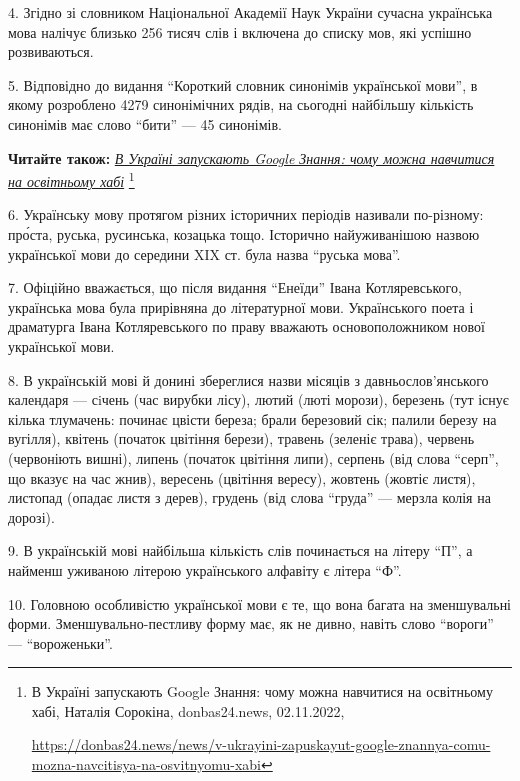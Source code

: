 4. Згідно зі словником Національної Академії Наук України сучасна українська
мова налічує близько 256 тисяч слів і включена до списку мов, які успішно
розвиваються.

5. Відповідно до видання \enquote{Короткий словник синонімів української мови}, в якому
розроблено 4279 синонімічних рядів, на сьогодні найбільшу кількість синонімів
має слово \enquote{бити} — 45 синонімів.


\textbf{Читайте також:} \href{https://donbas24.news/news/v-ukrayini-zapuskayut-google-znannya-comu-mozna-navcitisya-na-osvitnyomu-xabi}{\emph{В Україні запускають Google Знання: чому можна навчитися на освітньому хабі}}%
\footnote{В Україні запускають Google Знання: чому можна навчитися на освітньому хабі, Наталія Сорокіна, donbas24.news, 02.11.2022, \par%
\url{https://donbas24.news/news/v-ukrayini-zapuskayut-google-znannya-comu-mozna-navcitisya-na-osvitnyomu-xabi}%
}

6. Українську мову протягом різних історичних періодів називали по-різному:
про́ста, руська, русинська, козацька тощо. Історично найуживанішою назвою
української мови до середини XIX ст. була назва \enquote{руська мова}.

7. Офіційно вважається, що після видання \enquote{Енеїди} Івана Котляревського,
українська мова була прирівняна до літературної мови. Українського поета і
драматурга Івана Котляревського по праву вважають основоположником нової
української мови.

8. В українській мові й донині збереглися назви місяців з давньослов'янського
календаря — сiчень (час вирубки лісу), лютий (люті морози), березень (тут існує
кілька тлумачень: починає цвісти береза; брали березовий сік; палили березу на
вугілля), квітень (початок цвітіння берези), травень (зеленіє трава), червень
(червоніють вишні), липень (початок цвітіння липи), серпень (від слова \enquote{серп},
що вказує на час жнив), вересень (цвітіння вересу), жовтень (жовтіє листя),
листопад (опадає листя з дерев), грудень (від слова \enquote{груда} — мерзла колія на
дорозі).

9. В українській мові найбільша кількість слів починається на літеру \enquote{П}, а
найменш уживаною літерою українського алфавіту є літера \enquote{Ф}.

10. Головною особливістю української мови є те, що вона багата на зменшувальні
форми. Зменшувально-пестливу форму має, як не дивно, навіть слово \enquote{вороги} —
\enquote{вороженьки}.


